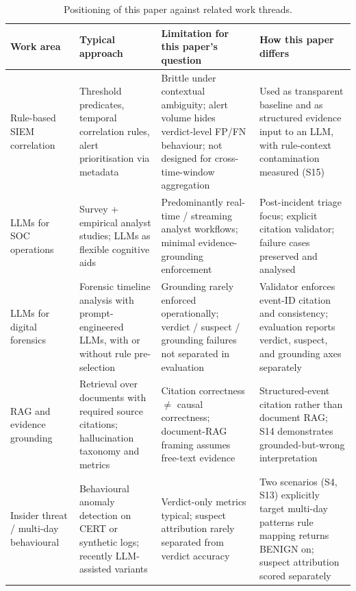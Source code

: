 \documentclass[conference]{IEEEtran}
\begin{document}
\begin{table}[ht]
\centering
\caption{Positioning of this paper against related work threads.}
\label{tab:related-positioning}
\small
\begin{tabular}{L{0.18\textwidth}L{0.22\textwidth}L{0.22\textwidth}L{0.28\textwidth}}
\toprule
\textbf{Work area} & \textbf{Typical approach} & \textbf{Limitation for this paper's question} & \textbf{How this paper differs} \\
\midrule
Rule-based SIEM correlation~\cite{ref1,ref2} & Threshold predicates, temporal correlation rules, alert prioritisation via metadata & Brittle under contextual ambiguity; alert volume hides verdict-level FP/FN behaviour; not designed for cross-time-window aggregation & Used as transparent baseline and as structured evidence input to an LLM, with rule-context contamination measured (S15) \\
LLMs for SOC operations~\cite{ref3,ref4} & Survey + empirical analyst studies; LLMs as flexible cognitive aids & Predominantly real-time / streaming analyst workflows; minimal evidence-grounding enforcement & Post-incident triage focus; explicit citation validator; failure cases preserved and analysed \\
LLMs for digital forensics~\cite{ref5,ref6,ref7,ref8,ref9} & Forensic timeline analysis with prompt-engineered LLMs, with or without rule pre-selection & Grounding rarely enforced operationally; verdict / suspect / grounding failures not separated in evaluation & Validator enforces event-ID citation and consistency; evaluation reports verdict, suspect, and grounding axes separately \\
RAG and evidence grounding~\cite{ref10,ref11} & Retrieval over documents with required source citations; hallucination taxonomy and metrics & Citation correctness $\neq$ causal correctness; document-RAG framing assumes free-text evidence & Structured-event citation rather than document RAG; S14 demonstrates grounded-but-wrong interpretation \\
Insider threat / multi-day behavioural~\cite{ref12,ref13} & Behavioural anomaly detection on CERT or synthetic logs; recently LLM-assisted variants & Verdict-only metrics typical; suspect attribution rarely separated from verdict accuracy & Two scenarios (S4, S13) explicitly target multi-day patterns rule mapping returns BENIGN on; suspect attribution scored separately \\
\bottomrule
\end{tabular}
\end{table}
\end{document}
